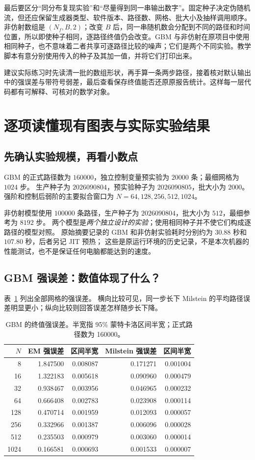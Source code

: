 \documentclass[11pt,a4paper,fontset=none]{ctexart}
\numberwithin{equation}{section}
\begin{document}
最后要区分“同分布复现实验”和“尽量得到同一串输出数字”。固定种子决定伪随机流，但还应保留生成器类型、软件版本、路径数、网格、批大小及抽样调用顺序。非仿射数组是 $(N_f,B,2)$；改变 $B$ 后，同一串随机数会分配到不同的路径和时间位置，所以即使种子相同，逐路径终值仍会改变。GBM 与非仿射在原项目中使用相同种子，也不意味着二者共享可逐路径比较的噪声；它们是两个不同实验。教学脚本有意分别使用传入的种子及其加一值，并将它们打印出来。

建议实际练习时先读清一批的数组形状，再手算一条两步路径，接着核对默认输出中的强误差与带符号弱差，最后查看保存终值能否还原原报告统计。这样每一层代码都有可解释、可核对的数学对象。


\section{逐项读懂现有图表与实际实验结果}\label{sec:results}
\subsection{先确认实验规模，再看小数点}
GBM 的正式路径数为 $160000$，独立控制变量预实验为 $20000$ 条；最细网格为 $1024$ 步。
生产种子为 $2026090804$，预实验种子为 $2026090805$，批大小为 $2000$。
强阶和控制后弱阶的主要拟合窗口为 $N=64,128,256,512,1024$。

非仿射模型使用 $100000$ 条路径，生产种子为 $2026090804$，批大小为 $512$，最细参考为 $8192$ 步。
两个模型是\emph{两个独立设计的实验}；使用相同种子并不使它们构成逐路径的模型对照。
原始摘要记录的 GBM 和非仿射实验耗时分别约为 $30.88$ 秒和 $107.80$ 秒，后者另记 JIT 预热；
这些是原运行环境的历史记录，不是本次机器的性能测试，也不是保证任何电脑都能达到的速度。

\subsection{GBM 强误差：数值体现了什么？}
表~\ref{tab:results-gbm-strong} 列出全部网格的强误差。
横向比较可见，同一步长下 Milstein 的平均路径误差明显更小；纵向比较则回答误差怎样随步长下降。
\begin{table}[htbp]\centering\small
\caption{GBM 的终值强误差。半宽指 95\% 蒙特卡洛区间半宽；正式路径数为 160000。}\label{tab:results-gbm-strong}
\begin{tabular}{rrrrr}\toprule
$N$ & EM 强误差 & 区间半宽 & Milstein 强误差 & 区间半宽\\\midrule
8 & 1.847500 & 0.008087 & 0.171271 & 0.001004\\
16 & 1.322183 & 0.005618 & 0.090960 & 0.000479\\
32 & 0.938467 & 0.003956 & 0.046965 & 0.000232\\
64 & 0.666408 & 0.002783 & 0.023908 & 0.000114\\
128 & 0.470714 & 0.001959 & 0.012093 & 0.000057\\
256 & 0.332966 & 0.001387 & 0.006096 & 0.000028\\
512 & 0.235503 & 0.000979 & 0.003060 & 0.000014\\
1024 & 0.166581 & 0.000693 & 0.001533 & 0.000007\\
\bottomrule
\end{tabular}
\end{table}
\end{document}
